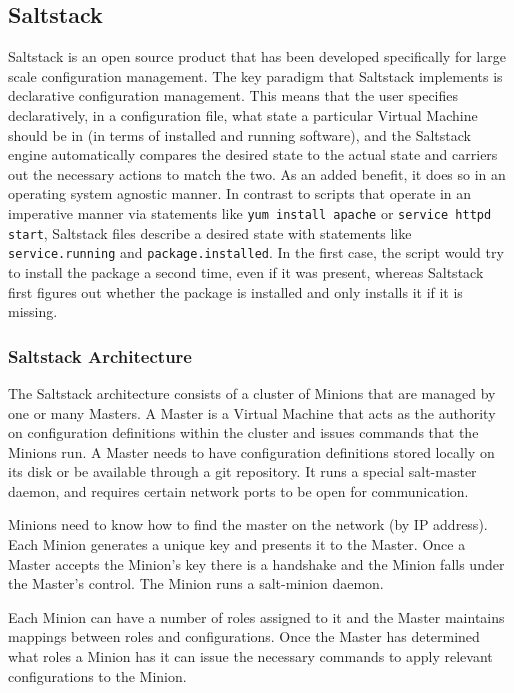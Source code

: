 \subsection {Saltstack}

Saltstack is an open source product that has been developed specifically for large scale configuration management. The key paradigm that Saltstack implements is declarative configuration management. This means that the user specifies declaratively, in a configuration file, what state a particular Virtual Machine should be in (in terms of installed and running software), and the Saltstack engine automatically compares the desired state to the actual state and carriers out the necessary actions to match the two. As an added benefit, it does so in an operating system agnostic manner. In contrast to scripts that operate in an imperative manner via statements like \texttt{yum install apache} or \texttt{service httpd start}, Saltstack files describe a desired state with statements like \texttt{service.running} and \texttt{package.installed}. In the first case, the script would try to install the package a second time, even if it was present, whereas Saltstack first figures out whether the package is installed and only installs it if it is missing.

\subsubsection {Saltstack Architecture}

The Saltstack architecture consists of a cluster of Minions that are managed by one or many Masters. A Master is a Virtual Machine that acts as the authority on configuration definitions within the cluster and issues commands that the Minions run. A Master needs to have configuration definitions stored locally on its disk or be available through a git repository. It runs a special salt-master daemon, and requires certain network ports to be open for communication.

Minions need to know how to find the master on the network (by IP address). Each Minion generates a unique key and presents it to the Master. Once a Master accepts the Minion's key there is a handshake and the Minion falls under the Master's control. The Minion runs a salt-minion daemon.

Each Minion can have a number of roles assigned to it and the Master maintains mappings between roles and configurations. Once the Master has determined what roles a Minion has it can issue the necessary commands to apply relevant configurations to the Minion. 

